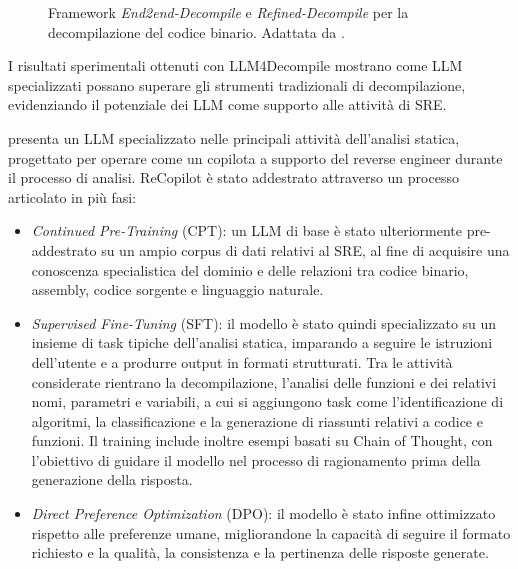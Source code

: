 \begin{description}
\begin{figure}[t]
        \caption[Framework \emph{End2end-Decompile} e \emph{Refined-Decompile}]{
            Framework \emph{End2end-Decompile} e \emph{Refined-Decompile} per la decompilazione del codice binario. Adattata da \cite{tan2024llm4decompile}.
        }
        \label{fig:llm_decompile}
    \end{figure}

    I risultati sperimentali ottenuti con LLM4Decompile mostrano come LLM specializzati possano superare gli strumenti tradizionali di decompilazione, evidenziando il potenziale dei LLM come supporto alle attività di SRE.

    \item[ReCopilot \cite{chen2025recopilot}:] presenta un LLM specializzato nelle principali attività dell'analisi statica, progettato per operare come un copilota a supporto del reverse engineer durante il processo di analisi. ReCopilot è stato addestrato attraverso un processo articolato in più fasi:

    \begin{itemize}
        \item \emph{Continued Pre-Training} (CPT): un LLM di base è stato ulteriormente pre-addestrato su un ampio corpus di dati relativi al SRE, al fine di acquisire una conoscenza specialistica del dominio e delle relazioni tra codice binario, assembly, codice sorgente e linguaggio naturale.

        \item \emph{Supervised Fine-Tuning} (SFT): il modello è stato quindi specializzato su un insieme di task tipiche dell'analisi statica, imparando a seguire le istruzioni dell'utente e a produrre output in formati strutturati. Tra le attività considerate rientrano la decompilazione, l'analisi delle funzioni e dei relativi nomi, parametri e variabili, a cui si aggiungono task come l'identificazione di algoritmi, la classificazione e la generazione di riassunti relativi a codice e funzioni. Il training include inoltre esempi basati su Chain of Thought, con l'obiettivo di guidare il modello nel processo di ragionamento prima della generazione della risposta.

        \item \emph{Direct Preference Optimization} (DPO): il modello è stato infine ottimizzato rispetto alle preferenze umane, migliorandone la capacità di seguire il formato richiesto e la qualità, la consistenza e la pertinenza delle risposte generate.
    \end{itemize}


\end{description}
